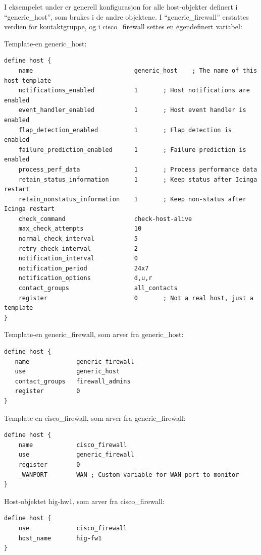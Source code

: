 I eksempelet under er generell konfigurasjon for alle host-objekter definert i ``generic\_host'', som brukes i de andre objektene. I ``generic\_firewall'' erstattes verdien for kontaktgruppe, og i cisco\_firewall settes en egendefinert variabel:

Template-en generic\_host: 
\begin{lstlisting}[style=example]
define host {
    name                            generic_host    ; The name of this host template
    notifications_enabled           1       ; Host notifications are enabled
    event_handler_enabled           1       ; Host event handler is enabled
    flap_detection_enabled          1       ; Flap detection is enabled
    failure_prediction_enabled      1       ; Failure prediction is enabled
    process_perf_data               1       ; Process performance data
    retain_status_information       1       ; Keep status after Icinga restart
    retain_nonstatus_information    1       ; Keep non-status after Icinga restart
    check_command                   check-host-alive
    max_check_attempts              10
    normal_check_interval           5
    retry_check_interval            2
    notification_interval           0
    notification_period             24x7
    notification_options            d,u,r
    contact_groups                  all_contacts
    register                        0       ; Not a real host, just a template
}
\end{lstlisting}

Template-en generic\_firewall, som arver fra generic\_host:
\begin{lstlisting}[style=example]
define host {
   name             generic_firewall
   use              generic_host
   contact_groups   firewall_admins
   register         0
}
\end{lstlisting}

Template-en cisco\_firewall, som arver fra generic\_firewall:
\begin{lstlisting}[style=example]
define host {
    name            cisco_firewall
    use             generic_firewall
    register        0
    _WANPORT        WAN ; Custom variable for WAN port to monitor
}
\end{lstlisting}

Host-objektet hig-hw1, som arver fra cisco\_firewall:
\begin{lstlisting}[style=example]
define host {
    use             cisco_firewall
    host_name	    hig-fw1
}
\end{lstlisting}

